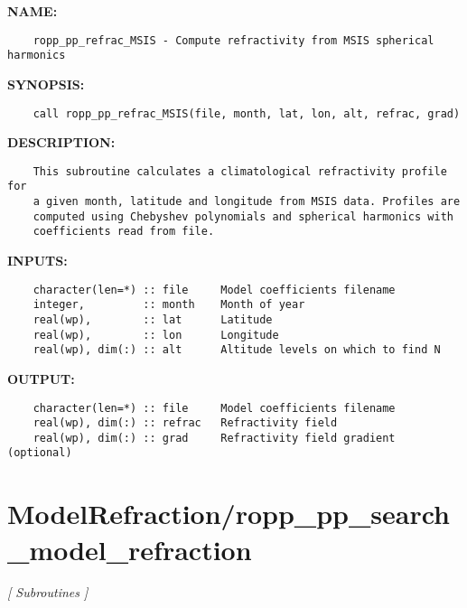 \label{ch:robo40}
\label{ch:ModelRefraction_ropp_pp_refrac_MSIS}
\textbf{NAME:}\hspace{0.08in}\begin{Verbatim}
    ropp_pp_refrac_MSIS - Compute refractivity from MSIS spherical harmonics
\end{Verbatim}
\textbf{SYNOPSIS:}\hspace{0.08in}\begin{Verbatim}
    call ropp_pp_refrac_MSIS(file, month, lat, lon, alt, refrac, grad)
\end{Verbatim}
\textbf{DESCRIPTION:}\hspace{0.08in}\begin{Verbatim}
    This subroutine calculates a climatological refractivity profile for 
    a given month, latitude and longitude from MSIS data. Profiles are 
    computed using Chebyshev polynomials and spherical harmonics with 
    coefficients read from file.
\end{Verbatim}
\textbf{INPUTS:}\hspace{0.08in}\begin{Verbatim}
    character(len=*) :: file     Model coefficients filename
    integer,         :: month    Month of year
    real(wp),        :: lat      Latitude
    real(wp),        :: lon      Longitude
    real(wp), dim(:) :: alt      Altitude levels on which to find N
\end{Verbatim}
\textbf{OUTPUT:}\hspace{0.08in}\begin{Verbatim}
    character(len=*) :: file     Model coefficients filename
    real(wp), dim(:) :: refrac   Refractivity field
    real(wp), dim(:) :: grad     Refractivity field gradient (optional)
\end{Verbatim}
\section{ModelRefraction/ropp\_pp\_search\_model\_refraction}
\textsl{[ Subroutines ]}


